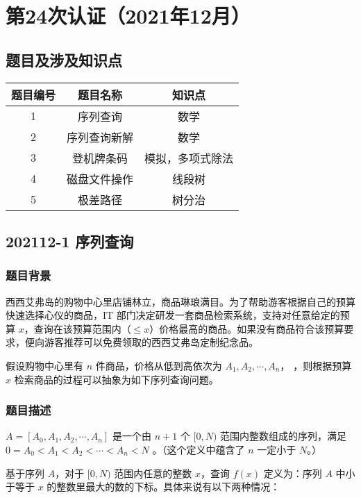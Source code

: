 \documentclass[cn,10pt,math=newtx,citestyle=gb7714-2015,bibstyle=gb7714-2015]{elegantbook}
\begin{document}
\chapter{第24次认证（2021年12月）}

\section{题目及涉及知识点}

\begin{table}[htbp]
  \centering
  \begin{tabular}{ccc}
    \toprule
    题目编号 & 题目名称 & 知识点\\
    \midrule
    1 & 序列查询 & 数学\\
    2 & 序列查询新解 & 数学\\
    3 & 登机牌条码 & 模拟，多项式除法\\
    4 & 磁盘文件操作 & 线段树\\
    5 & 极差路径 & 树分治\\
    \bottomrule
  \end{tabular}
\end{table}

\section{202112-1	序列查询}

\subsection*{题目背景}

西西艾弗岛的购物中心里店铺林立，商品琳琅满目。为了帮助游客根据自己的预算快速选择心仪的商品，IT 部门决定研发一套商品检索系统，支持对任意给定的预算 $x$，查询在该预算范围内（$\le x$）价格最高的商品。如果没有商品符合该预算要求，便向游客推荐可以免费领取的西西艾弗岛定制纪念品。

假设购物中心里有 $n$ 件商品，价格从低到高依次为 $A_1,A_2,\cdots, A_n$，
，则根据预算 $x$ 检索商品的过程可以抽象为如下序列查询问题。

\subsection*{题目描述}

$A=[A_0,A_1,A_2,\cdots,A_n]$ 是一个由 $n+1$ 个 $[0,N)$ 范围内整数组成的序列，满足 $0=A_0<A_1<A_2<\cdots<A_n<N$
。（这个定义中蕴含了 $n$ 一定小于 $N$。）

基于序列 $A$，对于 $[0,N)$ 范围内任意的整数 $x$，查询 $f(x)$ 定义为：序列 $A$ 中{\heiti 小于等于} $x$ 的整数里最大的数的{\heiti 下标}。具体来说有以下两种情况：
\end{document}
